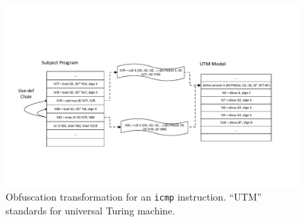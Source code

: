 \begin{figure}
 \includegraphics[width=\linewidth]{transform_pass.pdf}
 \caption{Obfuscation transformation for an \texttt{icmp} instruction. ``UTM''
   standards for universal Turing machine.}
 \label{fig:six}
\end{figure}

